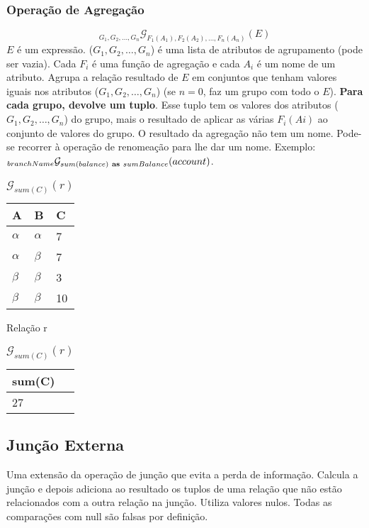 \documentclass{article}
\begin{document}
\subsubsection*{Operação de Agregação}
\[
  _{G_1,G_2, \dots , G_n}\mathcal{G}_{F_1(A_1), F_2(A_2), \dots ,F_n(A_n)}(E)
\]
$E$ é um expressão. ($G_1,G_2, \dots , G_n$) é uma lista de atributos de agrupamento (pode ser vazia). Cada $F_i$ é uma função de agregação e cada $A_i$ é um nome de um atributo. Agrupa a relação resultado de $E$ em conjuntos que tenham valores iguais nos atributos ($G_1,G_2, \dots , G_n$) (se $n = 0$, faz um grupo com todo o $E$). \textbf{Para cada grupo, devolve um tuplo}. Esse tuplo tem os valores dos atributos ($G_1,G_2, \dots , G_n$) do grupo, mais o resultado de aplicar as várias $F_i(Ai)$ ao conjunto de valores do grupo. O resultado da agregação não tem um nome. Pode-se recorrer à operação de renomeação para lhe dar um nome. Exemplo: $_{branchName}\mathcal{G}_{sum(balance) \ \textrm{\textbf{as}} \ sumBalance}(account)$.


\begin{table}[ht]
  \parbox{.45\linewidth}{
    \centering
    \begin{tabular}{|l|l|l|}
      \hline
      A        & B        & C  \\ \hline
      $\alpha$ & $\alpha$ & 7  \\ \hline
      $\alpha$ & $\beta$  & 7  \\ \hline
      $\beta$  & $\beta$  & 3  \\ \hline
      $\beta$  & $\beta$  & 10 \\ \hline
    \end{tabular}
    \caption{Relação r}
  }
  \hfill
  \parbox{.45\linewidth}{
    \centering
    \begin{tabular}{|l|}
      \hline
      sum(C) \\ \hline
      27     \\ \hline
    \end{tabular}
    \caption{$\mathcal{G}_{sum(C)}(r)$}
  }
\end{table}

\subsection{Junção Externa}
Uma extensão da operação de junção que evita a perda de informação. Calcula a junção e depois adiciona ao resultado os tuplos de uma relação que não estão relacionados com a outra relação na junção. Utiliza valores nulos. Todas as comparações com null são falsas por definição.
\end{document}
